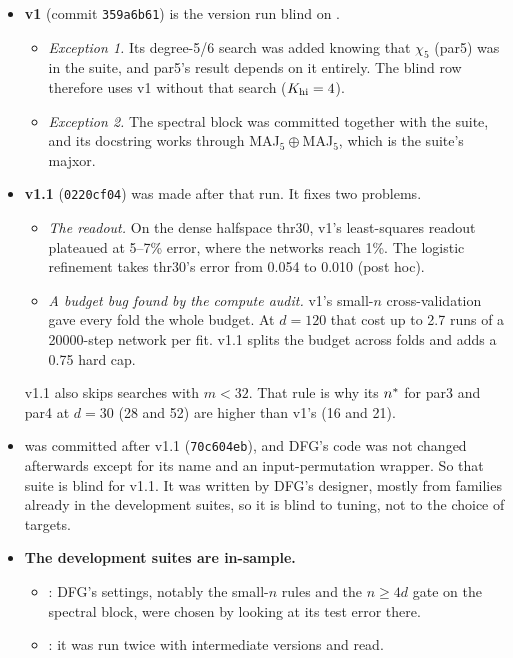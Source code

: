 \begin{itemize}
\item \textbf{v1} (commit \texttt{359a6b61}) is the version run blind on .
  \begin{itemize}
  \item \emph{Exception 1.} Its degree-5/6 search was added knowing that $\chi_5$ (par5) was in the suite, and par5's result depends on it entirely. The blind row therefore uses v1 without that search ($K_{\rm hi}=4$).
  \item \emph{Exception 2.} The spectral block was committed together with the suite, and its docstring works through MAJ$_5\oplus$MAJ$_5$, which is the suite's majxor.
  \end{itemize}
\item \textbf{v1.1} (\texttt{0220cf04}) was made after that run. It fixes two problems.
  \begin{itemize}
  \item \emph{The readout.} On the dense halfspace thr30, v1's least-squares readout plateaued at 5--7\% error, where the networks reach 1\%. The logistic refinement takes thr30's error from 0.054 to 0.010 (post hoc).
  \item \emph{A budget bug found by the compute audit.} v1's small-$n$ cross-validation gave every fold the whole budget. At $d=120$ that cost up to 2.7 runs of a 20000-step network per fit. v1.1 splits the budget across folds and adds a 0.75 hard cap.
  \end{itemize}
  v1.1 also skips searches with $m<32$. That rule is why its $n^{*}$ for par3 and par4 at $d=30$ (28 and 52) are higher than v1's (16 and 21).
\item \textbf{} was committed after v1.1 (\texttt{70c604eb}), and DFG's code was not changed afterwards except for its name and an input-permutation wrapper. So that suite is blind for v1.1. It was written by DFG's designer, mostly from families already in the development suites, so it is blind to tuning, not to the choice of targets.
\item \textbf{The development suites are in-sample.}
  \begin{itemize}
  \item {}: DFG's settings, notably the small-$n$ rules and the $n\ge4d$ gate on the spectral block, were chosen by looking at its test error there.
  \item {}: it was run twice with intermediate versions and read.
  \end{itemize}
\end{itemize}

